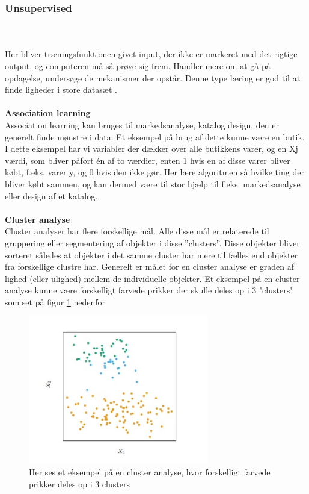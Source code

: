 \subsubsection*{Unsupervised}
\\\\
Her bliver træningsfunktionen givet input, der ikke er markeret med det rigtige output, og computeren må så prøve sig frem. Handler mere om at gå på opdagelse, undersøge de mekanismer der opstår. Denne type læring er god til at finde ligheder i store datasæt \cite{Jeanmonod2018}.
\\\\
\newpage
\textbf{Association learning}\\ 
Association learning kan bruges til markedsanalyse, katalog design, den er generelt finde mønstre i data. Et eksempel på brug af dette kunne være en butik. I dette eksempel har vi variabler der dækker over alle butikkens varer, og en Xj  værdi, som bliver påført én af to værdier, enten 1 hvis en af disse varer bliver købt, f.eks. varer y, og 0 hvis den ikke gør. Her lære algoritmen så hvilke ting der bliver købt sammen, og kan dermed være til stor hjælp til f.eks. markedsanalyse eller design af et katalog\cite{Rodriguez-Perez1994}.
\\\\
\textbf{Cluster analyse}\\
Cluster analyser har flere forskellige mål. Alle disse mål er relaterede til gruppering eller segmentering af objekter i disse ”clusters”. Disse objekter bliver sorteret således at objekter i det samme cluster har mere til fælles end objekter fra forskellige clustre har. Generelt er målet for en cluster analyse er graden af lighed (eller ulighed) mellem de individuelle objekter. 
Et eksempel på en cluster analyse kunne være forskelligt farvede prikker der skulle deles op i 3 "clusters"  som set på figur \ref{ClusterEksempel} nedenfor

\begin{figure}[H]
    \centering
    \includegraphics[width=0.7\textwidth]{figures/Cluster.jpg}
    \caption{Her ses et eksempel på en cluster analyse, hvor forskelligt farvede prikker deles op i 3 clusters \cite{Rodriguez-Perez1994}}
    \label{ClusterEksempel}
\end{figure}


